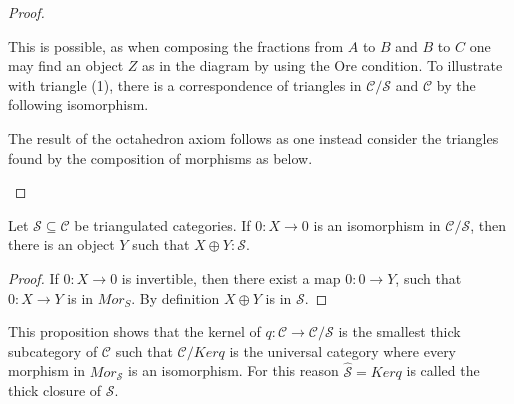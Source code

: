\begin{proof}
\begin{center}
\begin{tikzcd}[row sep=tiny]
            \end{tikzcd}
        \end{center}
        This is possible, as when composing the fractions from $A$ to $B$ and $B$ to $C$ one may find an object $Z$ as in the diagram by using the Ore condition. To illustrate with triangle (1), there is a correspondence of triangles in $\mathcal{C}/\mathcal{S}$ and $\mathcal{C}$ by the following isomorphism.
        \begin{center}
        \end{center}
        The result of the octahedron axiom follows as one instead consider the triangles found by the composition of morphisms as below.
        \begin{center}
        \end{center}
    \end{proof}

    \begin{prop}
        Let $\mathcal{S}\subseteq\mathcal{C}$ be triangulated categories. If $0:X\rightarrow 0$ is an isomorphism in $\mathcal{C}/\mathcal{S}$, then there is an object $Y$ such that $X\oplus Y:\mathcal{S}$.
    \end{prop}

    \begin{proof}
        If $0:X\rightarrow 0$ is invertible, then there exist a map $0:0\rightarrow Y$, such that $0:X\rightarrow Y$ is in $Mor_S$. By definition $X\oplus Y$ is in $\mathcal{S}$.
    \end{proof}

    This proposition shows that the kernel of $q:\mathcal{C}\rightarrow\mathcal{C}/\mathcal{S}$ is the smallest thick subcategory of $\mathcal{C}$ such that $\mathcal{C}/Kerq$ is the universal category where every morphism in $Mor_\mathcal{S}$ is an isomorphism. For this reason $\widehat{\mathcal{S}}=Kerq$ is called the thick closure of $\mathcal{S}$.


